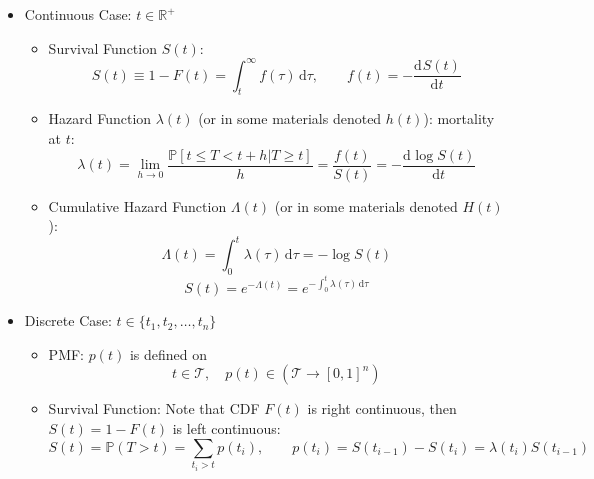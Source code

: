 \begin{itemize}[topsep=2pt,itemsep=0pt]
    \item Continuous Case: $ t\in \mathbb{R}^+ $
    \begin{itemize}[topsep=2pt,itemsep=0pt]
        \item Survival Function $ S(t) $:
        \begin{equation}
            S(t)\equiv 1-F(t) =\int _t^\infty f(\tau) \,\mathrm{d}\tau,\qquad f(t)=-\dfrac{\mathrm{d}^{} S(t)}{\mathrm{d}t^{}}
        \end{equation}
        
        \item Hazard Function $ \lambda (t) $ (or in some materials denoted $ h(t) $): mortality at $ t $:
        \begin{equation}
            \lambda (t)=\lim_{h\to 0}\dfrac{\mathbb{P}[t\leq T<t+h|T\geq t]}{h}= \dfrac{f(t)}{S(t)}=-\dfrac{\mathrm{d}^{} \log S(t)}{\mathrm{d}t^{}}
        \end{equation}
        \item Cumulative Hazard Function $ \Lambda (t) $ (or in some materials denoted $ H(t) $):
        \begin{equation}
            \Lambda (t)=\int _0^t \lambda (\tau) \,\mathrm{d}\tau =-\log S(t)
        \end{equation}
        \begin{equation}
            S(t)=e^{-\Lambda (t)}=e^{-\int _0^t \lambda (\tau) \,\mathrm{d}\tau} 
        \end{equation}
        
    \end{itemize}
    \item Discrete Case: $ t\in \{t_1,t_2,\ldots,t_n\} $
    \begin{itemize}[topsep=2pt,itemsep=0pt]
        \item PMF: $ p(t) $ is defined on 
        \begin{equation}
            t\in\mathcal{T},\quad p(t)\in (\mathcal{T}\to [0,1]^n) 
        \end{equation}
        \item Survival Function: Note that CDF $ F(t) $ is right continuous, then $ S(t) =1-F(t)$ is left continuous:
        \begin{equation}
            S(t)=\mathbb{P}(T>t)=\sum_{t_i>t} p(t_i),\qquad p(t_i)=S(t_{i-1})-S(t_i)=\lambda (t_i)S(t_{i-1})
        \end{equation}
        

\end{itemize}
\end{itemize}
